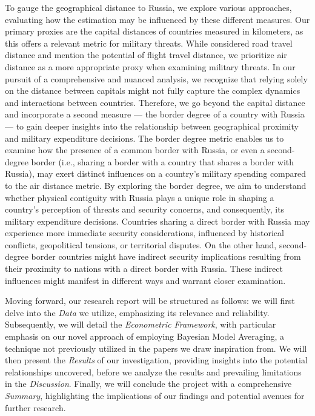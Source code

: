 \documentclass[12pt,a4paper]{article}
\begin{document}
To gauge the geographical distance to Russia, we explore various approaches, evaluating how the estimation may be influenced by these different measures. Our primary proxies are the capital distances of countries measured in kilometers, as this offers a relevant metric for military threats. While \citet{kofrovn2023} considered road travel distance and mention the potential of flight travel distance, we prioritize air distance as a more appropriate proxy when examining military threats. 
In our pursuit of a comprehensive and nuanced analysis, we recognize that relying solely on the distance between capitals might not fully capture the complex dynamics and interactions between countries. Therefore, we go beyond the capital distance and incorporate a second measure — the border degree of a country with Russia — to gain deeper insights into the relationship between geographical proximity and military expenditure decisions. The border degree metric enables us to examine how the presence of a common border with Russia, or even a second-degree border (i.e., sharing a border with a country that shares a border with Russia), may exert distinct influences on a country's military spending compared to the air distance metric. By exploring the border degree, we aim to understand whether physical contiguity with Russia plays a unique role in shaping a country's perception of threats and security concerns, and consequently, its military expenditure decisions. Countries sharing a direct border with Russia may experience more immediate security considerations, influenced by historical conflicts, geopolitical tensions, or territorial disputes. On the other hand, second-degree border countries might have indirect security implications resulting from their proximity to nations with a direct border with Russia. These indirect influences might manifest in different ways and warrant closer examination.

Moving forward, our research report will be structured as follows: we will first delve into the \textit{Data} we utilize, emphasizing its relevance and reliability. Subsequently, we will detail the \textit{Econometric Framework}, with particular emphasis on our novel approach of employing Bayesian Model Averaging, a technique not previously utilized in the papers we draw inspiration from. We will then present the \textit{Results} of our investigation, providing insights into the potential relationships uncovered, before we analyze the results and prevailing limitations in the \textit{Discussion}. Finally, we will conclude the project with a comprehensive \emph{Summary},
highlighting the implications of our findings and potential avenues for further research.
\end{document}
